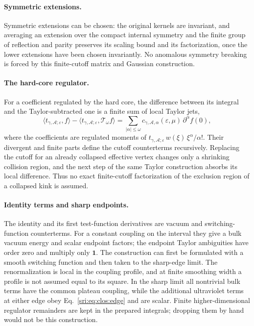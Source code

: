 \paragraph{Symmetric extensions.} Symmetric extensions can be chosen: the original kernels are invariant, and averaging
an extension over the compact internal symmetry and the finite group of reflection and parity preserves its scaling
bound and its factorization, once the lower extensions have been chosen invariantly. No anomalous symmetry breaking is
forced by this finite-cutoff matrix and Gaussian construction.

\paragraph{The hard-core regulator.} For a coefficient regulated by the hard core, the difference between its integral
and the Taylor-subtracted one is a finite sum of local Taylor jets,
\begin{equation}
 \langle t_{\gamma,\mathcal A;\varepsilon},f\rangle-\langle t_{\gamma,\mathcal A;\varepsilon},\mathcal T_\omega f\rangle
 =\sum_{|\alpha|\le\omega}c_{\gamma,\mathcal A,\alpha}(\varepsilon,\mu)\,\partial^\alpha f(0),
 \label{sri:eq:clos:cutoffdiff}
\end{equation}
where the coefficients are regulated moments of $t_{\gamma,\mathcal A;\varepsilon}\,w(\xi)\,\xi^\alpha/\alpha!$. Their
divergent and finite parts define the cutoff counterterms recursively. Replacing the cutoff for an already collapsed
effective vertex changes only a shrinking collision region, and the next step of the same Taylor construction absorbs
its local difference. Thus no exact finite-cutoff factorization of the exclusion region of a collapsed kink is assumed.

\paragraph{Identity terms and sharp endpoints.} The identity and its first test-function derivatives are vacuum and
switching-function counterterms. For a constant coupling on the interval they give a bulk vacuum energy and scalar
endpoint factors; the endpoint Taylor ambiguities have order zero and multiply only $\mathbf 1$. The construction can
first be formulated with a smooth switching function and then taken to the sharp-edge limit. The renormalization is
local in the coupling profile, and at finite smoothing width a profile is not assumed equal to its square. In the sharp
limit all nontrivial bulk terms have the common plateau coupling, while the additional ultraviolet terms at either
edge obey Eq.~\eqref{sri:eq:clos:edge} and are scalar. Finite higher-dimensional regulator remainders are kept in the
prepared integrals; dropping them by hand would not be this construction.

